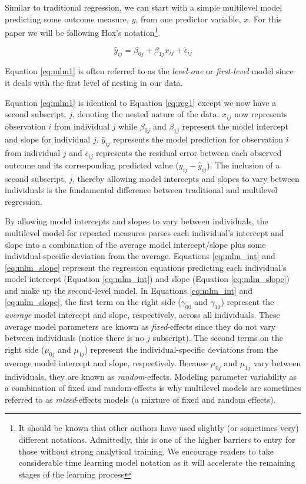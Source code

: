 \documentclass[
]{article}
\begin{document}
\noindent
Similar to traditional regression, we can start with a simple multilevel model predicting some outcome measure, \(y\), from one predictor variable, \(x\). For this paper we will be following Hox's \cite{hox2017} notation\footnote{It should be known that other authors have used slightly (or sometimes very) different notations. Admittedly, this is one of the higher barriers to entry for those without strong analytical training. We encourage readers to take considerable time learning model notation as it will accelerate the remaining stages of the learning process}.

\begin{equation}
\hat{y}_{ij}=\beta_{0j}+\beta_{1j}x_{ij}+\epsilon_{ij}
\label{eq:mlm1}
\end{equation}

\noindent
Equation \ref{eq:mlm1} is often referred to as the \emph{level-one} or \emph{first-level} model since it deals with the first level of nesting in our data.

Equation \ref{eq:mlm1} is identical to Equation \ref{eq:reg1} except we now have a second subscript, \(j\), denoting the nested nature of the data. \(x_{ij}\) now represents observation \(i\) from individual \(j\) while \(\beta_{0j}\) and \(\beta_{1j}\) represent the model intercept and slope for individual \(j\). \(\hat{y}_{ij}\) represents the model prediction for observation \(i\) from individual \(j\) and \(\epsilon_{ij}\) represents the residual error between each observed outcome and its corresponding predicted value (\(y_{ij}-\hat{y}_{ij}\)). The inclusion of a second subscript, \(j\), thereby allowing model intercepts and slopes to vary between individuals is the fundamental difference between traditional and multilevel regression.

By allowing model intercepts and slopes to vary between individuals, the multilevel model for repeated measures parses each individual's intercept and slope into a combination of the average model intercept/slope plus some individual-specific deviation from the average. Equations \ref{eq:mlm_int} and \ref{eq:mlm_slope} represent the regression equations predicting each individual's model intercept (Equation \ref{eq:mlm_int}) and slope (Equation \ref{eq:mlm_slope}) and make up the second-level model. In Equations \ref{eq:mlm_int} and \ref{eq:mlm_slope}, the first term on the right side (\(\gamma_{00}\) and \(\gamma_{10}\)) represent the \emph{average} model intercept and slope, respectively, across all individuals. These average model parameters are known as \emph{fixed}-effects since they do not vary between individuals (notice there is no \(j\) subscript). The second terms on the right side (\(\mu_{0j}\) and \(\mu_{1j}\)) represent the individual-specific deviations from the average model intercept and slope, respectively. Because \(\mu_{0j}\) and \(\mu_{1j}\) vary between individuals, they are known as \emph{random}-effects. Modeling parameter variability as a combination of fixed and random-effects is why multilevel models are sometimes referred to as \emph{mixed}-effects models (a mixture of fixed and random effects).
\end{document}
